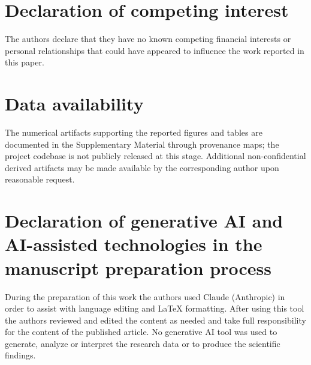 \documentclass[5p]{elsarticle}
\begin{document}
\section*{Declaration of competing interest}
The authors declare that they have no known competing financial interests or personal relationships
that could have appeared to influence the work reported in this paper.

\section*{Data availability}
The numerical artifacts supporting the reported figures and tables are documented in the
Supplementary Material through provenance maps; the project codebase is not publicly released at
this stage. Additional non-confidential derived artifacts may be made available by the corresponding
author upon reasonable request.

\section*{Declaration of generative AI and AI-assisted technologies in the manuscript preparation process}
During the preparation of this work the authors used Claude (Anthropic) in order to assist with
language editing and \LaTeX{} formatting. After using this tool the authors reviewed and edited the
content as needed and take full responsibility for the content of the published article. No
generative AI tool was used to generate, analyze or interpret the research data or to produce the
scientific findings.



\end{document}
